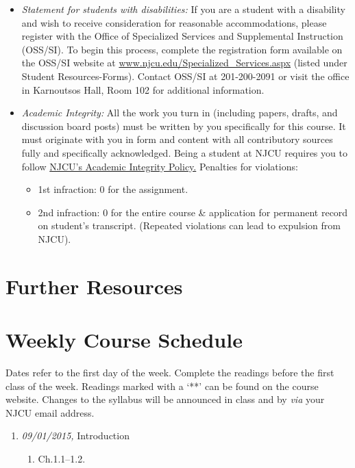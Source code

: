 \documentclass[11pt,article,oneside]{memoir}
\begin{document}
\begin{itemize}
{\begin{itemize}
\item \textit{Statement for students with disabilities:} If you are a student
with a disability and wish to receive consideration for reasonable
accommodations, please register with the Office of Specialized Services
and Supplemental Instruction (OSS/SI). To begin this process, complete
the registration form available on the OSS/SI website at
\href{http://www.njcu.edu/Specialized_Services.aspx}{www.njcu.edu/Specialized\_Services.aspx}
(listed under Student Resources-Forms). Contact OSS/SI at 201-200-2091
or visit the office in Karnoutsos Hall, Room 102 for additional
information.
\item \textit{Academic Integrity:} All the work you turn in (including papers, drafts, and discussion board posts) must be written by you specifically for this course. It must originate with you in form and content with all contributory sources fully and specifically acknowledged. Being a student at NJCU requires you to follow \href{http://www.njcu.edu/uploadedFiles/About_NJCU/Governance_and_Organization/University_Senate/Policies/Academic\%20INTEGRITY\%20POLICY\%20FINAL\%202-04.pdf}{NJCU's Academic Integrity Policy.} Penalties for violations: \begin{itemize}
\item 1st infraction: 0 for the assignment. 
\item 2nd infraction: 0 for the entire course \& application for permanent record on student's transcript. (Repeated violations can lead to expulsion from NJCU). 
\end{itemize}
\end{itemize}

\section{Further Resources}


\section{Weekly Course Schedule}
Dates refer to the first day of the week. Complete the readings before the first class of the week. Readings marked with a `**' can be found on the course website. Changes to the syllabus will be announced in class and by \emph{via} your NJCU email address.
\begin{enumerate}

\item \textit{09/01/2015,} Introduction
\begin{enumerate}
\item Ch.1.1--1.2.
\end{enumerate}



\end{enumerate}}
\end{itemize}
\end{document}

